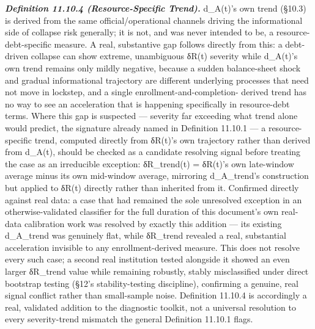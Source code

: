 \documentclass[
]{article}
\begin{document}
\emph{\textbf{Definition 11.10.4 (Resource-Specific Trend).}} d\_A(t)'s
own trend (§10.3) is derived from the same official/operational channels
driving the informational side of collapse risk generally; it is not,
and was never intended to be, a resource-debt-specific measure. A real,
substantive gap follows directly from this: a debt-driven collapse can
show extreme, unambiguous δR(t) severity while d\_A(t)'s own trend
remains only mildly negative, because a sudden balance-sheet shock and
gradual informational trajectory are different underlying processes that
need not move in lockstep, and a single enrollment-and-completion-
derived trend has no way to see an acceleration that is happening
specifically in resource-debt terms. Where this gap is suspected ---
severity far exceeding what trend alone would predict, the signature
already named in Definition 11.10.1 --- a resource-specific trend,
computed directly from δR(t)'s own trajectory rather than derived from
d\_A(t), should be checked as a candidate resolving signal before
treating the case as an irreducible exception: δR\_trend(t) = δR(t)'s
own late-window average minus its own mid-window average, mirroring
d\_A\_trend's construction but applied to δR(t) directly rather than
inherited from it. Confirmed directly against real data: a case that had
remained the sole unresolved exception in an otherwise-validated
classifier for the full duration of this document's own real-data
calibration work was resolved by exactly this addition --- its existing
d\_A\_trend was genuinely flat, while δR\_trend revealed a real,
substantial acceleration invisible to any enrollment-derived measure.
This does not resolve every such case; a second real institution tested
alongside it showed an even larger δR\_trend value while remaining
robustly, stably misclassified under direct bootstrap testing (§12's
stability-testing discipline), confirming a genuine, real signal
conflict rather than small-sample noise. Definition 11.10.4 is
accordingly a real, validated addition to the diagnostic toolkit, not a
universal resolution to every severity-trend mismatch the general
Definition 11.10.1 flags.
\end{document}
